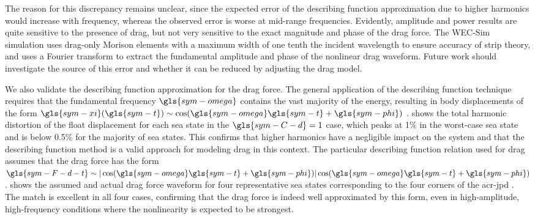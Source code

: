 \documentclass[a4paper,fleqn,colorlinks,unicode,lineno]{cas-dc} %
\begin{document}
The reason for this discrepancy remains unclear, since the expected error of the describing function approximation due to higher harmonics would increase with frequency, whereas the observed error is worse at mid-range frequencies.
Evidently, amplitude and power results are quite sensitive to the presence of drag, but not very sensitive to the exact magnitude and phase of the drag force.
The WEC-Sim simulation uses drag-only Morison elements with a maximum width of one tenth the incident wavelength to ensure accuracy of strip theory, and uses a Fourier transform to extract the fundamental amplitude and phase of the nonlinear drag waveform.
Future work should investigate the source of this error and whether it can be reduced by adjusting the drag model.

We also validate the describing function approximation for the drag force.
The general application of the describing function technique requires that the fundamental frequency $\gls{sym-omega}$  contains the vast majority of the energy, resulting in body displacements of the form $\gls{sym-xi}(\gls{sym-t}) \sim \cos(\gls{sym-omega} \gls{sym-t}+\gls{sym-phi})$ .
 shows the total harmonic distortion of the float displacement for each sea state in the $\gls{sym-C-d}=1$  case, which peaks at 1\% in the worst-case sea state and is below 0.5\% for the majority of sea states.
This confirms that higher harmonics have a negligible impact on the system and that the describing function method is a valid approach for modeling drag in this context.
The particular describing function relation used for drag assumes that the drag force has the form
$\gls{sym-F-d-t} \sim |\cos(\gls{sym-omega} \gls{sym-t}+\gls{sym-phi})|
                       \cos(\gls{sym-omega} \gls{sym-t}+\gls{sym-phi})$ .
 shows the assumed and actual drag force waveform for four representative sea states corresponding to the four corners of the \gls{acr-jpd} .
The match is excellent in all four cases, confirming that the drag force is indeed well approximated by this form, even in high-amplitude, high-frequency conditions where the nonlinearity is expected to be strongest.
\end{document}
